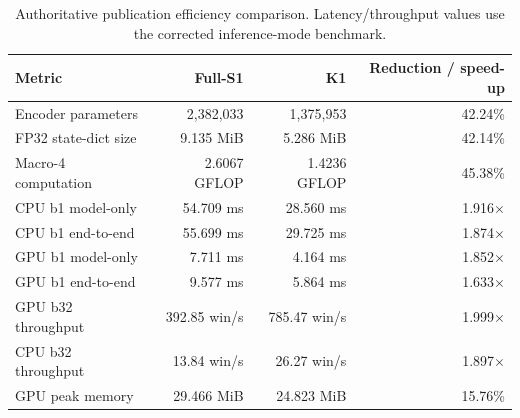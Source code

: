 \begin{table}[t]
\centering
\caption{Authoritative publication efficiency comparison. Latency/throughput values use the corrected inference-mode benchmark.}
\label{tab:efficiency}
\small
\begin{tabular}{lrrr}
\toprule
Metric & Full-S1 & K1 & Reduction / speed-up \\
\midrule
Encoder parameters & 2,382,033 & 1,375,953 & 42.24\% \\
FP32 state-dict size & 9.135 MiB & 5.286 MiB & 42.14\% \\
Macro-4 computation & 2.6067 GFLOP & 1.4236 GFLOP & 45.38\% \\
CPU b1 model-only & 54.709 ms & 28.560 ms & 1.916$\times$ \\
CPU b1 end-to-end & 55.699 ms & 29.725 ms & 1.874$\times$ \\
GPU b1 model-only & 7.711 ms & 4.164 ms & 1.852$\times$ \\
GPU b1 end-to-end & 9.577 ms & 5.864 ms & 1.633$\times$ \\
GPU b32 throughput & 392.85 win/s & 785.47 win/s & 1.999$\times$ \\
CPU b32 throughput & 13.84 win/s & 26.27 win/s & 1.897$\times$ \\
GPU peak memory & 29.466 MiB & 24.823 MiB & 15.76\% \\
\bottomrule
\end{tabular}
\end{table}
